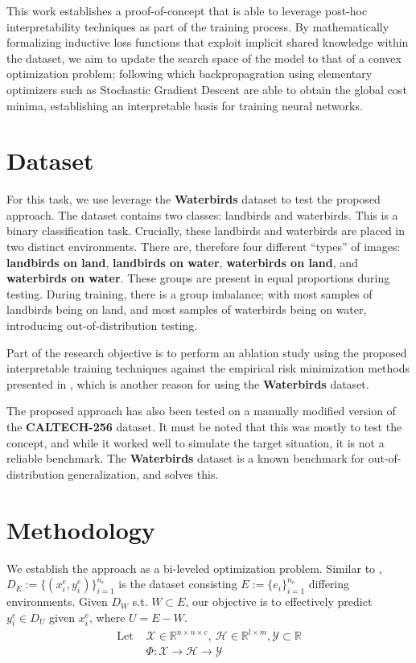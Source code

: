 \documentclass{article} %
\begin{document}
This work establishes a proof-of-concept that is able to leverage post-hoc interpretability techniques as part of the training process. By mathematically formalizing inductive loss functions that exploit implicit shared knowledge within the dataset, we aim to update the search space of the model to that of a convex optimization problem; following which backpropagration using elementary optimizers such as Stochastic Gradient Descent \citep{amari1993backpropagation} are able to obtain the global cost minima, establishing an interpretable basis for training neural networks.

\section{Dataset}
\label{dataset}

For this task, we use leverage the \textbf{Waterbirds} \citep{sagawa2019distributionally} dataset to test the proposed approach. The dataset contains two classes: landbirds and waterbirds. This is a binary classification task. Crucially, these landbirds and waterbirds are placed in two distinct environments. There are, therefore four different ``types'' of images: \textbf{landbirds on land}, \textbf{landbirds on water}, \textbf{waterbirds on land}, and \textbf{waterbirds on water}. These groups are present in equal proportions during testing. During training, there is a group imbalance; with most samples of landbirds being on land, and most samples of waterbirds being on water, introducing out-of-distribution testing.

Part of the research objective is to perform an ablation study using the proposed interpretable training techniques against the empirical risk minimization methods presented in \citep{liu2021just}, which is another reason for using the \textbf{Waterbirds} dataset.

The proposed approach has also been tested on a manually modified version of the \textbf{CALTECH-256} \citep{griffin2007caltech} dataset. It must be noted that this was mostly to test the concept, and while it worked well to simulate the target situation, it is not a reliable benchmark. The \textbf{Waterbirds} dataset is a known benchmark for out-of-distribution generalization, and solves this.

\section{Methodology}

We establish the approach as a bi-leveled optimization problem. Similar to \citep{arjovsky2019invariant}, $ D_E := \{(x^e_i, y^e_i)\}_{i=1}^{n_e} $ is the dataset consisting $E := \{e_i\}^{n_e}_{i=1}$ differing environments. Given $D_W$ s.t. $W \subset E$, our objective is to effectively predict $y_i^e \in D_U$ given $x_i^e$, where $U = E - W$.
\begin{align*}
	\text{Let } & \mathcal{X} \in \mathbb{R}^{n \times n \times c},\ \mathcal{H} \in \mathbb{R}^{l \times m}, \mathcal{Y} \subset \mathbb{R} \\
		    & \Phi : \mathcal{X} \rightarrow \mathcal{H} \rightarrow \mathcal{Y}
\end{align*}
\end{document}
